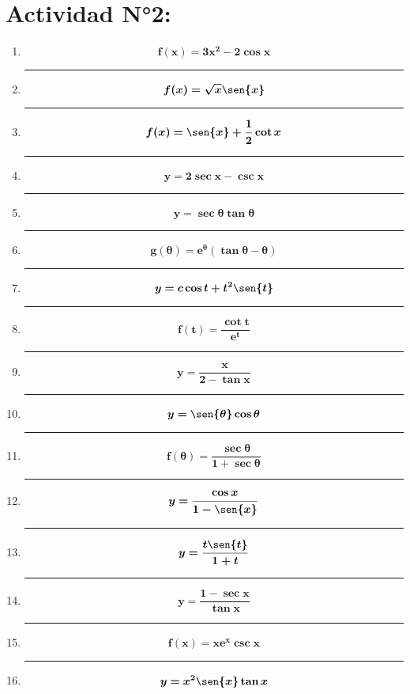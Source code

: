 \documentclass[12pt]{article}
\begin{document}
    \section*{Actividad N°2:}
        \vspace{0.5cm}
        \begin{enumerate}[label=\textbf{\arabic*)}] 
            \hrule\item \[\bm{f(x) = 3x^2 - 2\cos{x}}\]
            \hrule\item \[\bm{f(x) = \sqrt{x}\sen{x}}\]
            \hrule\item \[\bm{f(x) = \sen{x} + \frac{1}{2}\cot{x}}\]
            \hrule\item \[\bm{y = 2\sec{x} - \csc{x} }\]
            \hrule\item \[\bm{y = \sec{\theta}\tan{\theta}}\]
            \hrule\item \[\bm{g(\theta) = e^{\theta}(\tan{\theta} - \theta)}\]
            \hrule\item \[\bm{y = c\cos{t} + t^2 \sen{t}}\]
            \hrule\item \[\bm{f(t) = \frac{\cot{t}}{e^t}}\]
            \hrule\item \[\bm{y = \frac{x}{2 - \tan{x}}}\]
            \hrule\item \[\bm{y = \sen{\theta} \cos{\theta}}\]
            \hrule\item \[\bm{f(\theta) = \frac{\sec{\theta}}{1 + \sec{\theta}}}\]
            \hrule\item \[\bm{y = \frac{\cos{x}}{1 - \sen{x}}}\]
            \hrule\item \[\bm{y = \frac{t \sen{t}}{1 + t}}\]
            \hrule\item \[\bm{y = \frac{1 - \sec{x}}{\tan{x}}}\]
            \hrule\item \[\bm{f(x) = xe^x \csc{x}}\]
            \hrule\item \[\bm{y = x^2 \sen{x}\tan{x}}\]
        \end{enumerate}
\end{document}
